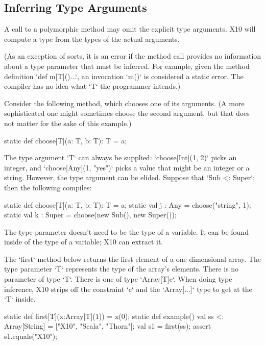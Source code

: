 {\subsection{Inferring Type Arguments}
\label{TypeParamInfer}


A call to a polymorphic method %
may omit the
explicit type arguments.  
X10 will compute a type from the types of the actual arguments. 

(As an exception of sorts, it is an error if the method call provides no information about
a type parameter that must be inferred.  For example, given the method
definition \xcd`def m[T](){...}`, an invocation \xcd`m()` is considered a
static error.  The compiler has no idea what \xcd`T` the programmer intends.)



\begin{ex}Consider the following method, which chooses one of its arguments.  (A more
sophisticated one might sometimes choose the second argument, but that does
not matter for the sake of this example.)
\begin{xten}
static def choose[T](a: T, b: T): T = a; 
\end{xten}


The type argument \xcd`T` can always be supplied: 
\xcd`choose[Int](1, 2)` picks an integer, 
and \xcd`choose[Any](1, "yes")` picks a value that might be an integer or a
string.  
However, the type argument can be elided.  Suppose that \xcd`Sub <: Super`;
then the following compiles: 

\begin{xten}
  static def choose[T](a: T, b: T): T = a; 
  static val j : Any = choose("string", 1);
  static val k : Super = choose(new Sub(), new Super());
\end{xten}
\end{ex}

The type parameter doesn't need to be the type of a variable. It can be found
inside of the type of a variable; X10 can extract it.

\begin{ex}
The \xcd`first` method below returns the first element of a one-dimensional
array.  The type parameter \xcd`T` represents the type of the array's
elements. There is no parameter of type \xcd`T`. There is one of type
\xcd`Array[T]{c}`.  When doing type inference, 
X10 strips off the constraint \xcd`{c}` and the
\xcd`Array[...]` type to get at the \xcd`T` inside.
\begin{xten}
static def first[T](x:Array[T](1)) = x(0);
static def example() {
  val ss <: Array[String] = ["X10", "Scala", "Thorn"];
  val s1 = first(ss);
  assert s1.equals("X10");
}
\end{xten}


\end{ex}}
